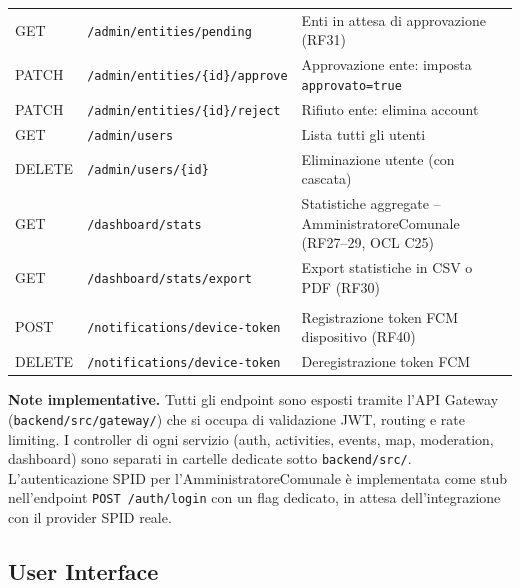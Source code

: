 \documentclass[11pt,a4paper]{article}
\newcommand{\code}[1]{\texttt{\small#1}}
\begin{document}
\begin{small}
\begin{longtable}{>{\centering\arraybackslash}p{1.6cm} p{7.2cm} p{6.2cm}}
  \midrule
  \multicolumn{3}{l}{\textbf{Admin e Dashboard}} \\
  \midrule
  GET & \code{/admin/entities/pending} & Enti in attesa di approvazione (RF31) \\
  \rowcolor{rowAlt}PATCH & \code{/admin/entities/\{id\}/approve} & Approvazione ente: imposta \code{approvato=true} \\
  PATCH & \code{/admin/entities/\{id\}/reject} & Rifiuto ente: elimina account \\
  \rowcolor{rowAlt}GET & \code{/admin/users} & Lista tutti gli utenti \\
  DELETE & \code{/admin/users/\{id\}} & Eliminazione utente (con cascata) \\
  \rowcolor{rowAlt}GET & \code{/dashboard/stats} & Statistiche aggregate -- AmministratoreComunale (RF27--29, OCL C25) \\
  GET & \code{/dashboard/stats/export} & Export statistiche in CSV o PDF (RF30) \\
  \midrule
  \multicolumn{3}{l}{\textbf{Notifiche}} \\
  \midrule
  \rowcolor{rowAlt}POST & \code{/notifications/device-token} & Registrazione token FCM dispositivo (RF40) \\
  DELETE & \code{/notifications/device-token} & Deregistrazione token FCM \\
  \bottomrule
  \end{longtable}
  \end{small}

  \begin{tcolorbox}[callout]
  \textbf{Note implementative.}
  Tutti gli endpoint sono esposti tramite l'API Gateway (\code{backend/src/gateway/})
  che si occupa di validazione JWT, routing e rate limiting.
  I controller di ogni servizio (auth, activities, events, map, moderation, dashboard)
  sono separati in cartelle dedicate sotto \code{backend/src/}. L'autenticazione SPID per
  l'AmministratoreComunale \`{e} implementata come stub nell'endpoint \code{POST /auth/login}
  con un flag dedicato, in attesa dell'integrazione con il provider SPID reale.
  \end{tcolorbox}

  \subsection{User Interface}
\end{document}
